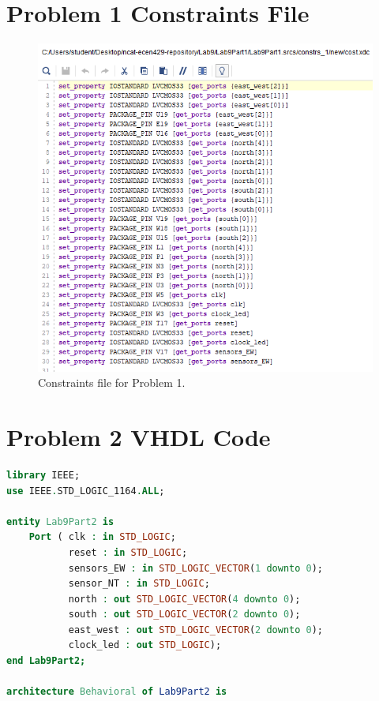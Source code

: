 \documentclass[11pt]{article}
\begin{document}
\begin{appendices}
\section{Problem 1 Constraints File}
\begin{center}
\begin{figure}[H]
	\includegraphics[scale=1]{./images/Part1/l9p1const.png}
	\caption{\label{fig:Prob1Const}Constraints file for Problem 1.}
\end{figure}
\end{center}

\section{Problem 2 VHDL Code}
\begin{lstlisting}[language=VHDL]
library IEEE;
use IEEE.STD_LOGIC_1164.ALL;

entity Lab9Part2 is
    Port ( clk : in STD_LOGIC;
           reset : in STD_LOGIC;
           sensors_EW : in STD_LOGIC_VECTOR(1 downto 0);
           sensor_NT : in STD_LOGIC;
           north : out STD_LOGIC_VECTOR(4 downto 0);
           south : out STD_LOGIC_VECTOR(2 downto 0);
           east_west : out STD_LOGIC_VECTOR(2 downto 0);
           clock_led : out STD_LOGIC);
end Lab9Part2;

architecture Behavioral of Lab9Part2 is


\end{lstlisting}
\end{appendices}
\end{document}
